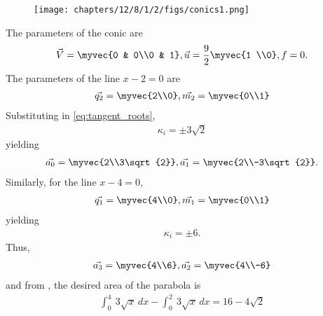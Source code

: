 	\begin{figure}[H]
		\centering
 \texttt{[image: chapters/12/8/1/2/figs/conics1.png]}
		\caption{}
		\label{fig:12/8/1/2}
  	\end{figure}
The parameters of the conic are
\begin{align}
 \vec{V} = \myvec{0 & 0\\0 & 1},
	\vec{u} = \frac{9}{2}\myvec{1 \\0},
 f = 0.
\end{align}
The parameters of 
the line $x-2=0$ are
\begin{align}
\vec{q_2}=\myvec{2\\0},
\vec{m_2}=\myvec{0\\1}
\end{align}
Substituting in 
\eqref{eq:tangent_roots},
\begin{align}
\kappa_i=\pm 3\sqrt{2}
\end{align}
yielding
\begin{align}
\vec{a_0}=\myvec{2\\3\sqrt{2}},
\vec{a_1}=\myvec{2\\-3\sqrt{2}}.
\end{align}
Similarly, 
for the line $x-4=0$,
\begin{align}
\vec{q_1}=\myvec{4\\0},
\vec{m_1}=\myvec{0\\1}
\end{align}
yielding
\begin{align}
\kappa_i=\pm 6.
\end{align}
Thus, 
\begin{align}
\vec{a_3}=\myvec{4\\6},
\vec{a_2}=\myvec{4\\-6}
\end{align}
and 
		from ,
the 
desired area of the parabola is
\begin{align}
\int_{0}^{4} \ 3\sqrt{x} \,dx-\int_{0}^{2} \ 3\sqrt{x} \,dx
=16-4\sqrt{2}
\end{align}

